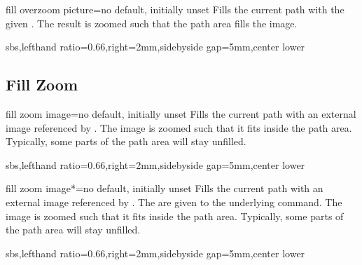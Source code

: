 \documentclass[a4paper,11pt]{article}
\begin{document}
\begin{myvoid}
\begin{docTikzKey}{fill overzoom picture}{=}{no default, initially unset}
  Fills the current path with the given .
  The result is zoomed such that the path area fills the image.
\begin{dispExample*}{sbs,lefthand ratio=0.66,right=2mm,sidebyside gap=5mm,center lower}
\end{dispExample*}
\end{docTikzKey}


\clearpage
\subsection{Fill Zoom}
\begin{docTikzKey}{fill zoom image}{=}{no default, initially unset}
  Fills the current path with an external image referenced by .
  The image is zoomed such that it fits inside the path area.
  Typically, some parts of the path area will stay unfilled.
\begin{dispExample*}{sbs,lefthand ratio=0.66,right=2mm,sidebyside gap=5mm,center lower}
\end{dispExample*}
\end{docTikzKey}


\begin{docTikzKey}{fill zoom image*}{=}{no default, initially unset}
  Fills the current path with an external image referenced by .
  The  are given to the underlying  command.
  The image is zoomed such that it fits inside the path area.
  Typically, some parts of the path area will stay unfilled.
\begin{dispExample*}{sbs,lefthand ratio=0.66,right=2mm,sidebyside gap=5mm,center lower}
\end{dispExample*}
\end{docTikzKey}



\end{myvoid}
\end{document}
